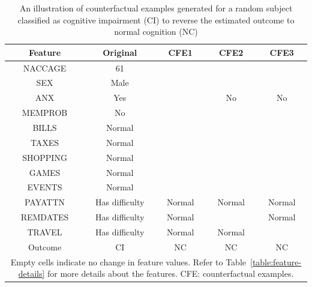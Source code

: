 \begin{table}[H]
    \centering
    \caption{An illustration of counterfactual examples generated for a random subject classified as cognitive impairment (CI) to reverse the estimated outcome to normal cognition (NC)}
    \begin{tabular}{|c|c|c|c|c|}
    \hline
        \textbf{Feature} & \textbf{Original} & \textbf{CFE1} & \textbf{CFE2} & \textbf{CFE3} \\ \hline
        NACCAGE & 61 & ~ & ~ & ~ \\ \hline
        SEX & Male & ~ & ~ & ~ \\ \hline
        ANX & Yes & ~ & No & No \\ \hline
        MEMPROB & No & ~ & ~ & ~ \\ \hline
        BILLS & Normal & ~ & ~ & ~ \\ \hline
        TAXES & Normal & ~ & ~ & ~ \\ \hline
        SHOPPING & Normal & ~ & ~ & ~ \\ \hline
        GAMES & Normal & ~ & ~ & ~ \\ \hline
        EVENTS & Normal & ~ & ~ & ~ \\ \hline
        PAYATTN & Has difficulty & Normal & Normal & Normal \\ \hline
        REMDATES & Has difficulty & Normal & ~ & Normal \\ \hline
        TRAVEL & Has difficulty & Normal & Normal & ~ \\ \hline
        Outcome & CI & NC & NC & NC \\ \hline
    \multicolumn{5}{p{280pt}}{\footnotesize Empty cells indicate no change in feature values. Refer to Table~\ref{table:feature-details} for more details about the features. CFE: counterfactual examples.}
    \end{tabular}
    \label{table:cfe-adni-task1-apdx}
\end{table}

